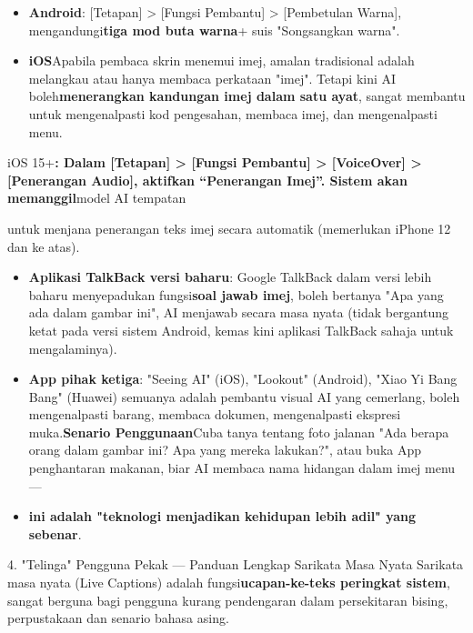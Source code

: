 
\begin{itemize}
  \item \textbf{Android}: [Tetapan] > [Fungsi Pembantu] > [Pembetulan Warna], mengandungi\textbf{tiga mod buta warna}+ suis "Songsangkan warna".
  \item \textbf{iOS}Apabila pembaca skrin menemui imej, amalan tradisional adalah melangkau atau hanya membaca perkataan "imej". Tetapi kini AI boleh\textbf{menerangkan kandungan imej dalam satu ayat}, sangat membantu untuk mengenalpasti kod pengesahan, membaca imej, dan mengenalpasti menu.
\end{itemize}


iOS 15+\textbf{: Dalam [Tetapan] > [Fungsi Pembantu] > [VoiceOver] > [Penerangan Audio], aktifkan “Penerangan Imej”. Sistem akan memanggil}model AI tempatan

\begin{tcbinfo}{untuk menjana penerangan teks imej secara automatik (memerlukan iPhone 12 dan ke atas).}
\begin{itemize}
  \item \textbf{Aplikasi TalkBack versi baharu}: Google TalkBack dalam versi lebih baharu menyepadukan fungsi\textbf{soal jawab imej}, boleh bertanya "Apa yang ada dalam gambar ini", AI menjawab secara masa nyata (tidak bergantung ketat pada versi sistem Android, kemas kini aplikasi TalkBack sahaja untuk mengalaminya).
  \item \textbf{App pihak ketiga}: "Seeing AI" (iOS), "Lookout" (Android), "Xiao Yi Bang Bang" (Huawei) semuanya adalah pembantu visual AI yang cemerlang, boleh mengenalpasti barang, membaca dokumen, mengenalpasti ekspresi muka.\textbf{Senario Penggunaan}Cuba tanya tentang foto jalanan "Ada berapa orang dalam gambar ini? Apa yang mereka lakukan?", atau buka App penghantaran makanan, biar AI membaca nama hidangan dalam imej menu —
  \item \textbf{ini adalah "teknologi menjadikan kehidupan lebih adil" yang sebenar}.
\end{itemize}

\end{tcbinfo}

\begin{tcbpractice}{4. "Telinga" Pengguna Pekak — Panduan Lengkap Sarikata Masa Nyata}
Sarikata masa nyata (Live Captions) adalah fungsi\textbf{ucapan-ke-teks peringkat sistem}, sangat berguna bagi pengguna kurang pendengaran dalam persekitaran bising, perpustakaan dan senario bahasa asing.

\end{tcbpractice}

